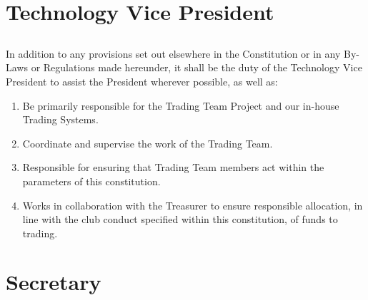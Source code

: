\documentclass[10.5pt]{article}
\begin{document}
\section{Technology Vice President}
\subsection{} In addition to any provisions set out elsewhere in the Constitution or in any By-Laws or Regulations made hereunder, it shall be the duty of the Technology Vice President to assist the President wherever possible, as well as: 
\begin{enumerate}[label=(\alph*)]
    \item Be primarily responsible for the Trading Team Project and our in-house Trading Systems.
    \item Coordinate and supervise the work of the Trading Team.
    \item Responsible for ensuring that Trading Team members act within the parameters of this constitution.
    \item Works in collaboration with the Treasurer to ensure responsible allocation, in line with the club conduct specified within this constitution, of funds to trading.
\newline
\end{enumerate}


\section{Secretary}
\end{document}

